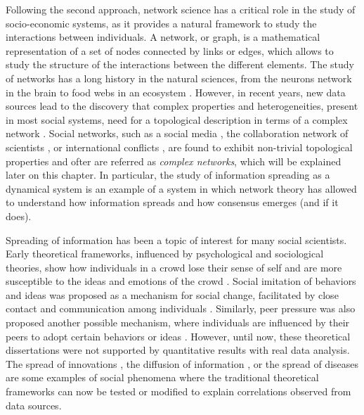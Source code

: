 Following the second approach, network science has a critical role in the study of socio-economic systems, as it provides a natural framework to study the interactions between individuals. A network, or graph, is a mathematical representation of a set of nodes connected by links or edges, which allows to study the structure of the interactions between the different elements. The study of networks has a long history in the natural sciences, from the neurons network in the brain \cite{sporns-2004} to food webs in an ecosystem \cite{ings-2008, elith-2009, bastolla-2009}. However, in recent years, new data sources lead to the discovery that complex properties and heterogeneities, present in most social systems, need for a topological description in terms of a complex network \cite{newman-book, dorogovtsev2002evolution, boccaletti2006complex}. Social networks, such as a social media \cite{dunbar-2015}, the collaboration network of scientists \cite{newman-coll-2001,radicchi-2008}, or international conflicts \cite{hafnerburton-2009, diaz2023network}, are found to exhibit non-trivial topological properties and ofter are referred as \textit{complex networks}, which will be explained later on this chapter. In particular, the study of information spreading as a dynamical system is an example of a system in which network theory has allowed to understand how information spreads and how consensus emerges (and if it does).

Spreading of information has been a topic of interest for many social scientists. Early theoretical frameworks, influenced by psychological and sociological theories, show how individuals in a crowd lose their sense of self and are more susceptible to the ideas and emotions of the crowd \cite{le2023crowd}. Social imitation of behaviors and ideas was proposed as a mechanism for social change, facilitated by close contact and communication among individuals \cite{kanter-1971}. Similarly, peer pressure was also proposed another possible mechanism, where individuals are influenced by their peers to adopt certain behaviors or ideas \cite{granovetter-1978, brown-1986}. However, until now, these theoretical dissertations were not supported by quantitative results with real data analysis. The spread of innovations \cite{rogers2014}, the diffusion of information \cite{valente-1996}, or the spread of diseases \cite{anderson1991infectious} are some examples of social phenomena where the traditional theoretical frameworks can now be tested or modified to explain correlations observed from data sources.

